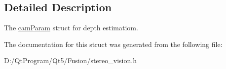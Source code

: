 \subsection{Detailed Description}
The \hyperlink{structstereo__vision_1_1cam_param}{cam\+Param} struct for depth estimatiom. 

The documentation for this struct was generated from the following file\+:\begin{DoxyCompactItemize}
\item 
D\+:/\+Qt\+Program/\+Qt5/\+Fusion/stereo\+\_\+vision.\+h\end{DoxyCompactItemize}
